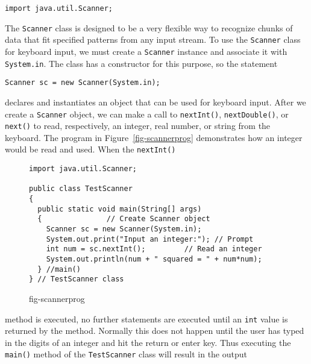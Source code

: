 \begin{jjjlisting}
\begin{lstlisting}
import java.util.Scanner;
\end{lstlisting}
\end{jjjlisting}

\noindent The {\tt Scanner} class is designed to be a very flexible way to
recognize chunks of data that fit specified patterns from any input
stream.  To use the {\tt Scanner} class for keyboard input, we must
create a {\tt Scanner} instance and associate it with {\tt System.in}.
The class has a constructor for this purpose, so the statement

\begin{jjjlisting}
\begin{lstlisting}
Scanner sc = new Scanner(System.in);
\end{lstlisting}
\end{jjjlisting}

\noindent declares and instantiates an  object that can be used for keyboard input.
After we create a {\tt Scanner} object, we can make a call to {\tt nextInt()},
{\tt nextDouble()}, or {\tt next()} to read, respectively, an integer, real 
number, or string from the keyboard.  The program in Figure~\ref{fig-scannerprog}
demonstrates how an integer would be read and used. When the {\tt nextInt()}
\begin{figure}[htb]
\jjjprogstart
\begin{jjjlisting}
\begin{lstlisting}
import java.util.Scanner;

public class TestScanner 
{
  public static void main(String[] args) 
  {               // Create Scanner object
    Scanner sc = new Scanner(System.in); 
    System.out.print("Input an integer:"); // Prompt
    int num = sc.nextInt();         // Read an integer
    System.out.println(num + " squared = " + num*num);
  } //main()
} // TestScanner class
\end{lstlisting}
\end{jjjlisting}
{fig-scannerprog}
\end{figure}
method is executed, no further statements are executed until an {\tt int} value
is returned by the method.  Normally this does not happen until the
user has typed in the digits of an integer and hit the return or enter key.
Thus executing the {\tt main()} method of the {\tt TestScanner}  class will 
result in the output 

